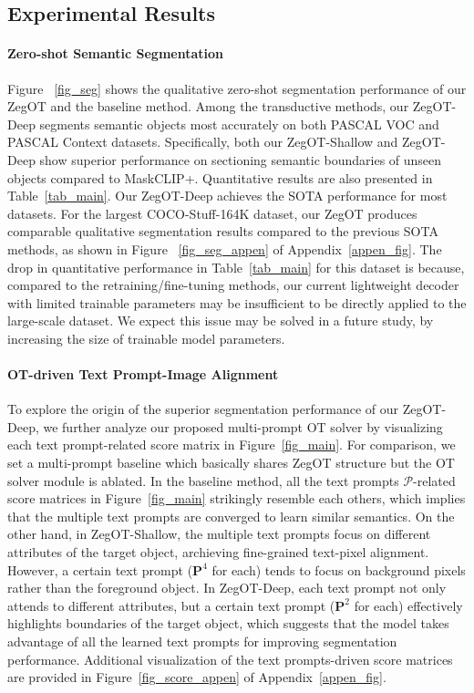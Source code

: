 \documentclass[nohyperref]{article}
\newcommand{\bs}{\boldsymbol}
\theoremstyle{plain}
\theoremstyle{definition}
\theoremstyle{remark}
\begin{document}
\subsection{Experimental Results}

\paragraph{Zero-shot Semantic Segmentation}
Figure ~\ref{fig_seg} shows the qualitative zero-shot segmentation performance of our ZegOT and the baseline method. Among the transductive methods, our ZegOT-Deep segments semantic objects most accurately on both PASCAL VOC and PASCAL Context datasets. Specifically, both our ZegOT-Shallow and ZegOT-Deep show superior performance on sectioning semantic boundaries of unseen objects compared to MaskCLIP+.
Quantitative results are also presented in Table~\ref{tab_main}. Our ZegOT-Deep achieves the SOTA performance for most datasets. 
For the largest COCO-Stuff-164K dataset, our ZegOT produces comparable qualitative segmentation results compared to the previous SOTA methods, as shown in Figure ~\ref{fig_seg_appen} of Appendix~\ref{appen_fig}. The drop in quantitative performance  in Table~\ref{tab_main} for this dataset  is because, compared to the retraining/fine-tuning methods, our current lightweight decoder with limited trainable parameters may be insufficient to be directly applied to the large-scale dataset. We expect this issue may be solved in a future study, by increasing the size of trainable model parameters. %

\vspace{-0.5em}
\paragraph{OT-driven Text Prompt-Image Alignment}
To explore the origin of the superior segmentation performance of our ZegOT-Deep, we further analyze our proposed multi-prompt OT solver by visualizing each text prompt-related score matrix in Figure~\ref{fig_main}. For comparison, we set a multi-prompt baseline which basically shares ZegOT structure but the OT solver module is ablated. In the baseline method, all the text prompts $\mathcal{P}$-related score matrices  in Figure~\ref{fig_main} strikingly resemble each others, which implies that the multiple text prompts are converged to learn similar semantics. On the other hand, in ZegOT-Shallow, the multiple text prompts focus on different attributes of the target object, archieving fine-grained text-pixel alignment. However, a certain text prompt ($\bs{P}^4$ for each) tends to focus on background pixels rather than the foreground object. In ZegOT-Deep, each text prompt not only attends to different attributes, but a certain text prompt  ($\bs{P}^2$ for each) effectively highlights boundaries of the target object, which suggests that the model takes advantage of all the learned text prompts for improving segmentation performance. {Additional visualization of the text prompts-driven score matrices are provided in Figure~\ref{fig_score_appen} of Appendix~\ref{appen_fig}.}
\end{document}
